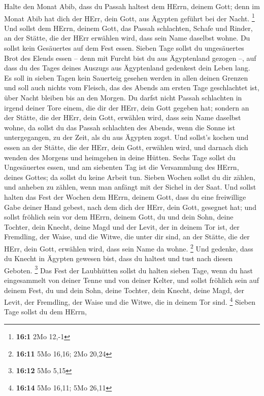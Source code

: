  Halte den Monat Abib, dass du Passah haltest dem HErrn,
deinem Gott; denn im Monat Abib hat dich der HErr, dein Gott, aus
Ägypten geführt bei der Nacht. \footnote{\textbf{16:1} 2Mo 12,-1}
 Und sollst dem HErrn, deinem Gott, das Passah schlachten,
Schafe und Rinder, an der Stätte, die der HErr erwählen wird, dass sein
Name daselbst wohne.  Du sollst kein Gesäuertes auf dem
Fest essen. Sieben Tage sollst du ungesäuertes Brot des Elends essen --
denn mit Furcht bist du aus Ägyptenland gezogen --, auf dass du des
Tages deines Auszugs aus Ägyptenland gedenkest dein Leben lang.
 Es soll in sieben Tagen kein Sauerteig gesehen werden in
allen deinen Grenzen und soll auch nichts vom Fleisch, das des Abends am
ersten Tage geschlachtet ist, über Nacht bleiben bis an den Morgen.
 Du darfst nicht Passah schlachten in irgend deiner Tore
einem, die dir der HErr, dein Gott gegeben hat;  sondern
an der Stätte, die der HErr, dein Gott, erwählen wird, dass sein Name
daselbst wohne, da sollst du das Passah schlachten des Abends, wenn die
Sonne ist untergegangen, zu der Zeit, als du aus Ägypten zogst.
 Und sollst's kochen und essen an der Stätte, die der
HErr, dein Gott, erwählen wird, und darnach dich wenden des Morgens und
heimgehen in deine Hütten.  Sechs Tage sollst du
Ungesäuertes essen, und am siebenten Tag ist die Versammlung des HErrn,
deines Gottes; da sollst du keine Arbeit tun.  Sieben
Wochen sollst du dir zählen, und anheben zu zählen, wenn man anfängt mit
der Sichel in der Saat.  Und sollst halten das Fest der
Wochen dem HErrn, deinem Gott, dass du eine freiwillige Gabe deiner Hand
gebest, nach dem dich der HErr, dein Gott, gesegnet hat; 
und sollst fröhlich sein vor dem HErrn, deinem Gott, du und dein Sohn,
deine Tochter, dein Knecht, deine Magd und der Levit, der in deinem Tor
ist, der Fremdling, der Waise, und die Witwe, die unter dir sind, an der
Stätte, die der HErr, dein Gott, erwählen wird, dass sein Name da wohne.
\footnote{\textbf{16:11} 5Mo 16,16; 2Mo 20,24}  Und
gedenke, dass du Knecht in Ägypten gewesen bist, dass du haltest und
tust nach diesen Geboten. \footnote{\textbf{16:12} 5Mo 5,15}
 Das Fest der Laubhütten sollst du halten sieben Tage,
wenn du hast eingesammelt von deiner Tenne und von deiner Kelter,
 und sollst fröhlich sein auf deinem Fest, du und dein
Sohn, deine Tochter, dein Knecht, deine Magd, der Levit, der Fremdling,
der Waise und die Witwe, die in deinem Tor sind. \footnote{\textbf{16:14}
  5Mo 16,11; 5Mo 26,11}  Sieben Tage sollst du dem HErrn,
